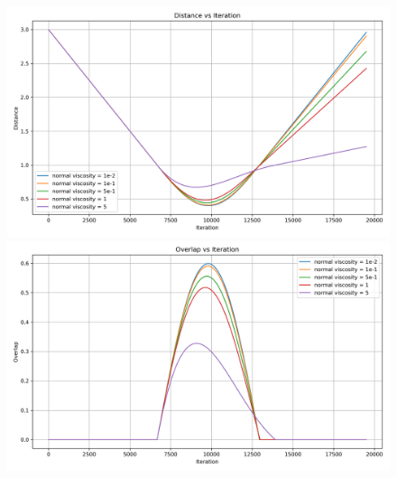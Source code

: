 \documentclass[11pt,
               a4paper,
               bibtotoc,
               idxtotoc,
               headsepline,
               footsepline,
               footexclude,
               BCOR12mm,
               DIV13,
               openany,   %
               ]
               {scrbook}
\begin{document}
\begin{figure}[H]
	\centering
	\begin{minipage}[t]{0.6\textwidth}
		\centering
		\includegraphics[width=\textwidth]{figures/contactForceLaws/linearNormalContactModel/Distance vs Iterationsimple_collision_two_particles_statistics_stiffness_50_viscosity_1e-2.png}
	\end{minipage}
	
		\vspace{0.5cm} %
		
	\begin{minipage}[t]{0.6\textwidth}
		\centering
		\includegraphics[width=\textwidth]{figures/contactForceLaws/linearNormalContactModel/Overlap vs Iterationsimple_collision_two_particles_statistics_stiffness_50_viscosity_1e-2.png}
	\end{minipage}
	
	\vspace{0.5cm} %
	

\end{figure}
\end{document}
